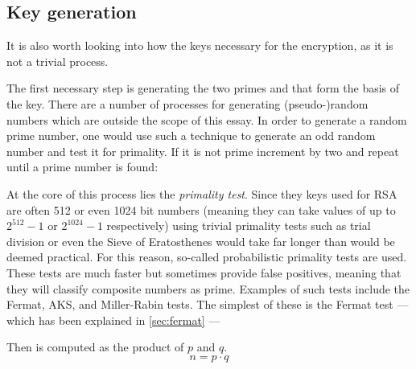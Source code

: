 \documentclass[12pt, titlepage]{article}
\begin{document}
\subsection{Key generation}

It is also worth looking into how the keys necessary for the encryption, as it is not a
trivial process.

The first necessary step is generating the two primes  and  that form the
basis of the key. There are a number of processes for generating (pseudo-)random numbers
which are outside the scope of this essay. In order to generate a random prime number, one
would use such a technique to generate an odd random number and test it for primality.  If
it is not prime increment by two and repeat until a prime number is found:
%
\begin{figure}[H]
\end{figure}
%
At the core of this process lies the \emph{primality test}. Since they keys used for RSA are
often 512 or even 1024 bit numbers (meaning they can take values of up to $2^{512} - 1$ or
$2^{1024} - 1$ respectively) using trivial primality tests such as trial division or even
the Sieve of Eratosthenes would take far longer than would be deemed practical.  For this
reason, so-called probabilistic primality tests are used. These tests are much faster but
sometimes provide false positives, meaning that they will classify composite numbers as
prime. Examples of such tests include the Fermat, AKS, and Miller-Rabin
tests\autocite{primality_akalin}. The simplest of these is the Fermat test --- which has
been explained in \autoref{sec:fermat} --- 

Then  is computed as the product of $p$ and $q$. $$n=p \cdot q$$
\end{document}
